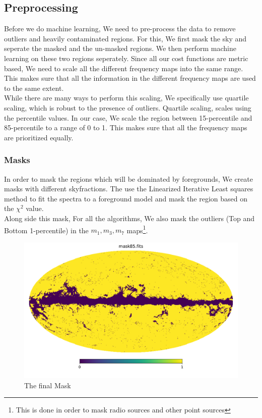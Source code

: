 \subsection{Preprocessing}
Before we do machine learning, We need to pre-process the data to remove outliers and heavily contaminated regions.
For this, We first mask the sky and seperate the masked and the un-masked regions. We then perform machine learning on these two regions seperately.
Since all our cost functions are metric based, We need to scale all the different frequency maps into the same range. This makes sure that
all the information in the different frequency maps are used to the same extent. 
\\
While there are many ways to perform this scaling, We specifically use quartile scaling, which is robust to the presence of outliers.
Quartile scaling, scales using the percentile values. In our case, We scale the region between 15-percentile and 85-percentile to a range of 0 to 1. 
This makes sure that all the frequency maps are prioritized equally.

\subsubsection{Masks}
In order to mask the regions which will be dominated by foregrounds, We create masks with different skyfractions. The use the Linearized Iterative Least
squares method \cite{lilrishi} to fit the spectra to a  foreground model and mask the region based on the $\chi^2$ value. \cite{rishimask}
\\
Along side this mask, For all the algorithms, We also mask the outliers (Top and Bottom 1-percentile) in the $m_1, m_3, m_7$ maps\footnote{This is done in order
  to mask radio sources and other point sources}.


\begin{figure}[H]
  \centering
  \includegraphics[width = 0.7\linewidth]{mask.pdf}
  \caption{The final Mask}
\end{figure}


